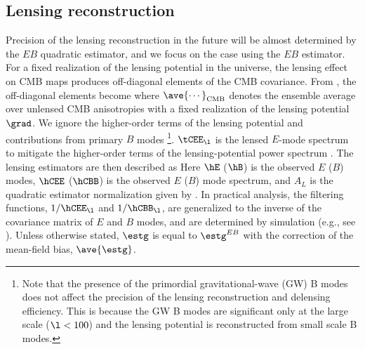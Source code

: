 \documentclass[aps,prd,twocolumn,superscriptaddress,groupedaddress,nofootinbib]{revtex4}
\begin{document}
\subsection{Lensing reconstruction}

Precision of the lensing reconstruction in the future will be almost determined by 
the $EB$ quadratic estimator, and we focus on the case using the $EB$ estimator. 
For a fixed realization of the lensing potential in the universe, the lensing effect on CMB maps produces 
off-diagonal elements of the CMB covariance. From , 
the off-diagonal elements become \cite{Hu:2001kj}
where $\ave{\cdots}_{\rm CMB}$ denotes the ensemble average over unlensed CMB anisotropies
with a fixed realization of the lensing potential $\grad$. 
We ignore the higher-order terms of the lensing potential and contributions from primary $B$ modes 
\footnote{
Note that the presence of the primordial gravitational-wave (GW) B modes does not affect 
the precision of the lensing reconstruction and delensing efficiency. 
This is because the GW B modes are significant only at the large scale ($\l<100$) and 
the lensing potential is reconstructed from small scale B modes.
}.
$\tCEE_\l$ is the lensed $E$-mode spectrum to mitigate the higher-order terms of 
the lensing-potential power spectrum \citep{Hanson:2010rp,Lewis:2011fk}.
The lensing estimators are then described as \cite{Hu:2001kj} 
Here $\hE$ ($\hB$) is the observed $E$ ($B$) modes, $\hCEE$ ($\hCBB$) is the observed $E$ ($B$) mode 
spectrum, and $A_L$ is the quadratic estimator normalization given by . 
In practical analysis, the filtering functions, $1/\hCEE_\l$ and $1/\hCBB_\l$, are generalized to the inverse of 
the covariance matrix of $E$ and $B$ modes, and are determined by simulation (e.g., see ). 
Unless otherwise stated, $\estg$ is equal to $\estg^{EB}$ with the correction of the mean-field bias, $\ave{\estg}$. 
\end{document}

